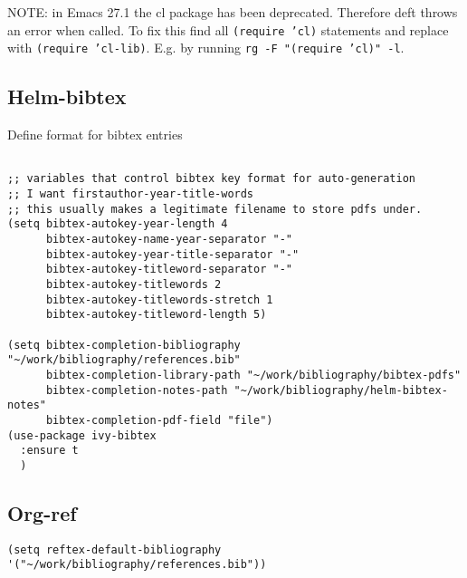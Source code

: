 \documentclass[12pt]{article}
\begin{document}
NOTE: in Emacs 27.1 the cl package has been deprecated. Therefore deft throws an error when called. To fix this find all \texttt{(require 'cl)} statements and replace with \texttt{(require 'cl-lib)}. E.g. by running \texttt{rg -F "(require 'cl)" -l}.


\subsection{Helm-bibtex}
\label{sec:org6ce8bad}

Define format for bibtex entries

\begin{verbatim}

;; variables that control bibtex key format for auto-generation
;; I want firstauthor-year-title-words
;; this usually makes a legitimate filename to store pdfs under.
(setq bibtex-autokey-year-length 4
      bibtex-autokey-name-year-separator "-"
      bibtex-autokey-year-title-separator "-"
      bibtex-autokey-titleword-separator "-"
      bibtex-autokey-titlewords 2
      bibtex-autokey-titlewords-stretch 1
      bibtex-autokey-titleword-length 5)

(setq bibtex-completion-bibliography "~/work/bibliography/references.bib"
      bibtex-completion-library-path "~/work/bibliography/bibtex-pdfs"
      bibtex-completion-notes-path "~/work/bibliography/helm-bibtex-notes"
      bibtex-completion-pdf-field "file")
(use-package ivy-bibtex
  :ensure t
  )

\end{verbatim}


\subsection{Org-ref}
\label{sec:orgc607506}


\begin{verbatim}
(setq reftex-default-bibliography '("~/work/bibliography/references.bib"))

\end{verbatim}
\end{document}
